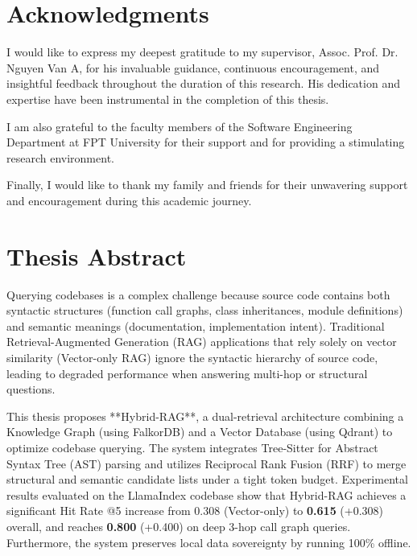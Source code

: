 \documentclass[12pt,a4paper,oneside]{report}
\begin{document}

\chapter*{Acknowledgments}
I would like to express my deepest gratitude to my supervisor, Assoc. Prof. Dr. Nguyen Van A, for his invaluable guidance, continuous encouragement, and insightful feedback throughout the duration of this research. His dedication and expertise have been instrumental in the completion of this thesis.

I am also grateful to the faculty members of the Software Engineering Department at FPT University for their support and for providing a stimulating research environment. 

Finally, I would like to thank my family and friends for their unwavering support and encouragement during this academic journey.

\newpage

\chapter*{Thesis Abstract}
Querying codebases is a complex challenge because source code contains both syntactic structures (function call graphs, class inheritances, module definitions) and semantic meanings (documentation, implementation intent). Traditional Retrieval-Augmented Generation (RAG) applications that rely solely on vector similarity (Vector-only RAG) ignore the syntactic hierarchy of source code, leading to degraded performance when answering multi-hop or structural questions.

This thesis proposes **Hybrid-RAG**, a dual-retrieval architecture combining a Knowledge Graph (using FalkorDB) and a Vector Database (using Qdrant) to optimize codebase querying. The system integrates Tree-Sitter for Abstract Syntax Tree (AST) parsing and utilizes Reciprocal Rank Fusion (RRF) to merge structural and semantic candidate lists under a tight token budget. Experimental results evaluated on the LlamaIndex codebase show that Hybrid-RAG achieves a significant Hit Rate @5 increase from 0.308 (Vector-only) to \textbf{0.615} (+0.308) overall, and reaches \textbf{0.800} (+0.400) on deep 3-hop call graph queries. Furthermore, the system preserves local data sovereignty by running 100\% offline.
\end{document}
